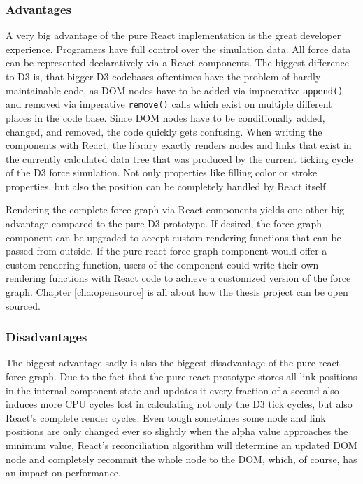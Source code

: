 \subsubsection{Advantages}


A very big advantage of the pure React implementation is the great developer experience. Programers have full control over the simulation data. All force data can be represented declaratively via a React components. The biggest difference to D3 is, that bigger D3 codebases oftentimes have the problem of hardly maintainable code, as DOM nodes have to be added via impoerative \texttt{append()} and removed via imperative \texttt{remove()} calls which exist on multiple different places in the code base. Since DOM nodes have to be conditionally added, changed, and removed, the code quickly gets confusing. When writing the components with React, the library exactly renders nodes and links that exist in the currently calculated data tree that was produced by the current ticking cycle of the D3 force simulation. Not only properties like filling color or stroke properties, but also the position can be completely handled by React itself.

Rendering the complete force graph via React components yields one other big advantage compared to the pure D3 prototype. If desired, the force graph component can be upgraded to accept custom rendering functions that can be passed from outside. If the pure react force graph component would offer a custom rendering function, users of the component could write their own rendering functions with React code to achieve a customized version of the force graph. Chapter \ref{cha:opensource} is all about how the thesis project can be open sourced.

\subsubsection{Disadvantages}

The biggest advantage sadly is also the biggest disadvantage of the pure react force graph. Due to the fact that the pure react prototype stores all link positions in the internal component state and updates it every fraction of a second also induces more CPU cycles lost in calculating not only the D3 tick cycles, but also React's complete render cycles. Even tough sometimes some node and link positions are only changed ever so slightly when the alpha value approaches the minimum value, React's reconciliation algorithm will determine an updated DOM node and completely recommit the whole node to the DOM, which, of course, has an impact on performance. 

